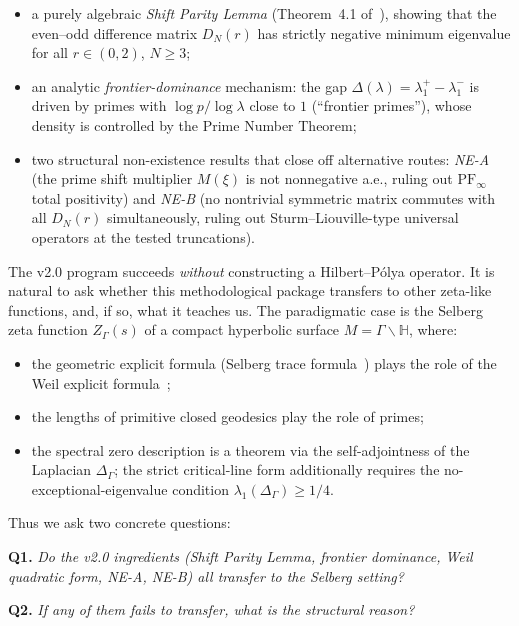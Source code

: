 \documentclass[12pt,a4paper]{article}
\theoremstyle{definition}
\theoremstyle{remark}
\newcommand{\HH}{\mathbb{H}}
\newcommand{\Sel}{Z_{\Gamma}}
\newcommand{\Delop}{\Delta_{\Gamma}}
\begin{document}
\begin{itemize}
\item a purely algebraic \emph{Shift Parity Lemma} (Theorem~4.1 of~\cite{Geiger2026partII}),
showing that the even--odd difference matrix $D_N(r)$ has strictly negative
minimum eigenvalue for all $r \in (0,2)$, $N \geq 3$;

\item an analytic \emph{frontier-dominance} mechanism: the gap
$\Delta(\lambda) = \lambda_1^+ - \lambda_1^-$ is driven by primes with
$\log p / \log\lambda$ close to $1$ (``frontier primes''), whose density is
controlled by the Prime Number Theorem;

\item two structural non-existence results that close off alternative routes:
\emph{NE-A} (the prime shift multiplier $M(\xi)$ is not nonnegative a.e.,
ruling out $\mathrm{PF}_\infty$ total positivity) and \emph{NE-B} (no nontrivial
symmetric matrix commutes with all $D_N(r)$ simultaneously, ruling out
Sturm--Liouville-type universal operators at the tested truncations).
\end{itemize}

The v2.0 program succeeds \emph{without} constructing a Hilbert--Pólya
operator. It is natural to ask whether this methodological package transfers
to other zeta-like functions, and, if so, what it teaches us. The paradigmatic
case is the Selberg zeta function $\Sel(s)$ of a compact hyperbolic surface
$M = \Gamma\backslash\HH$, where:

\begin{itemize}
\item the geometric explicit formula (Selberg trace formula~\cite{Selberg1956})
plays the role of the Weil explicit formula~\cite{Weil1952};
\item the lengths of primitive closed geodesics play the role of primes;
\item the spectral zero description is a theorem via the self-adjointness of
the Laplacian $\Delop$; the strict critical-line form additionally requires
the no-exceptional-eigenvalue condition $\lambda_1(\Delop)\ge 1/4$.
\end{itemize}

Thus we ask two concrete questions:

\medskip
\noindent\textbf{Q1.} \emph{Do the v2.0 ingredients (Shift Parity Lemma,
frontier dominance, Weil quadratic form, NE-A, NE-B) all transfer to the
Selberg setting?}

\medskip
\noindent\textbf{Q2.} \emph{If any of them fails to transfer, what is the
structural reason?}
\end{document}
